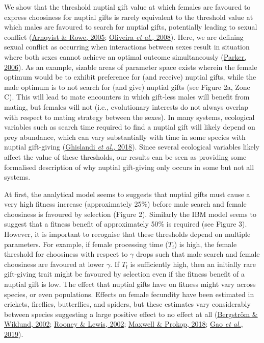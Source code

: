 \documentclass[
]{article}
\begin{document}
We show that the threshold nuptial gift value at which females are
favoured to express choosiness for nuptial gifts is rarely equivalent to
the threshold value at which males are favoured to search for nuptial
gifts, potentially leading to sexual conflict
(\protect\hyperlink{ref-Arnqvist2005a}{Arnqvist \& Rowe, 2005};
\protect\hyperlink{ref-Oliveira2008}{Oliveira \emph{et al.}, 2008}).
Here, we are defining sexual conflict as occurring when interactions
between sexes result in situation where both sexes cannot achieve an
optimal outcome simultaneously
(\protect\hyperlink{ref-Parker2006}{Parker, 2006}). As an example,
sizable areas of parameter space exists wherein the female optimum would
be to exhibit preference for (and receive) nuptial gifts, while the male
optimum is to not search for (and give) nuptial gifts (see Figure 2a,
Zone C). This will lead to mate encounters in which gift-less males will
benefit from mating, but females will not (i.e., evolutionary interests
do not always overlap with respect to mating strategy between the
sexes). In many systems, ecological variables such as search time
required to find a nuptial gift will likely depend on prey abundance,
which can vary substantially with time in some species with nuptial
gift-giving (\protect\hyperlink{ref-Ghislandi2018}{Ghislandi \emph{et
al.}, 2018}). Since several ecological variables likely affect the value
of these thresholds, our results can be seen as providing some
formalised description of why nuptial gift-giving only occurs in some
but not all systems.

At first, the analytical model seems to suggests that nuptial gifts must
cause a very high fitness increase (approximately 25\%) before male
search and female choosiness is favoured by selection (Figure 2).
Similarly the IBM model seems to suggest that a fitness benefit of
approximately 50\% is required (see Figure 3). However, it is important
to recognise that these thresholds depend on multiple parameters. For
example, if female processing time (\(T_{\mathrm{f}}\)) is high, the
female threshold for choosiness with respect to \(\gamma\) drops such
that male search and female choosiness are favoured at lower \(\gamma\).
If \(T_{\mathrm{f}}\) is sufficiently high, then an initially rare
gift-giving trait might be favoured by selection even if the fitness
benefit of a nuptial gift is low. The effect that nuptial gifts have on
fitness might vary across species, or even populations. Effects on
female fecundity have been estimated in crickets, fireflies,
butterflies, and spiders, but these estimates vary considerably between
species suggesting a large positive effect to no effect at all
(\protect\hyperlink{ref-Bergstrom2002}{Bergström \& Wiklund, 2002};
\protect\hyperlink{ref-Rooney2002}{Rooney \& Lewis, 2002};
\protect\hyperlink{ref-Maxwell2018}{Maxwell \& Prokop, 2018};
\protect\hyperlink{ref-Gao2019}{Gao \emph{et al.}, 2019}).
\end{document}
